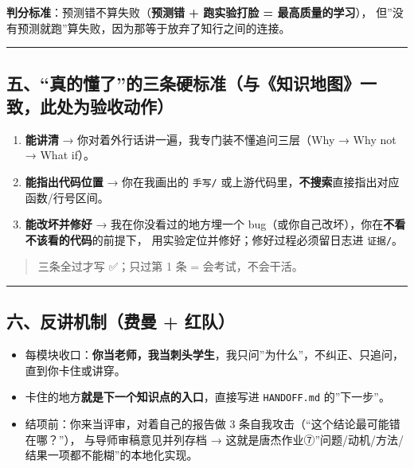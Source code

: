 \documentclass[
  chinese,
  11pt,
]{ctexart}
\providecommand{\tightlist}{%
  \setlength{\itemsep}{0pt}\setlength{\parskip}{0pt}}
\begin{document}
\textbf{判分标准}：预测错不算失败（\textbf{预测错 + 跑实验打脸 = 最高质量的学习}）， 但''没有预测就跑''算失败，因为那等于放弃了知行之间的连接。

\begin{center}\rule{0.5\linewidth}{0.5pt}\end{center}

\subsection{五、``真的懂了''的三条硬标准（与《知识地图》一致，此处为验收动作）}\label{ux4e94ux771fux7684ux61c2ux4e86ux7684ux4e09ux6761ux786cux6807ux51c6ux4e0eux77e5ux8bc6ux5730ux56feux4e00ux81f4ux6b64ux5904ux4e3aux9a8cux6536ux52a8ux4f5c}

\begin{enumerate}
\def\labelenumi{\arabic{enumi}.}
\tightlist
\item
  \textbf{能讲清} → 你对着外行话讲一遍，我专门装不懂追问三层（Why → Why not → What if）。
\item
  \textbf{能指出代码位置} → 你在我画出的 \texttt{手写/} 或上游代码里，\textbf{不搜索}直接指出对应函数/行号区间。
\item
  \textbf{能改坏并修好} → 我在你没看过的地方埋一个 bug（或你自己改坏），你在\textbf{不看不该看的代码}的前提下， 用实验定位并修好；修好过程必须留日志进 \texttt{证据/}。
\end{enumerate}

\begin{quote}
三条全过才写 ✅；只过第 1 条 = 会考试，不会干活。
\end{quote}

\begin{center}\rule{0.5\linewidth}{0.5pt}\end{center}

\subsection{六、反讲机制（费曼 + 红队）}\label{ux516dux53cdux8bb2ux673aux5236ux8d39ux66fc-ux7ea2ux961f}

\begin{itemize}
\tightlist
\item
  每模块收口：\textbf{你当老师，我当刺头学生}，我只问''为什么''，不纠正、只追问，直到你卡住或讲穿。
\item
  卡住的地方\textbf{就是下一个知识点的入口}，直接写进 \texttt{HANDOFF.md} 的''下一步''。
\item
  结项前：你来当评审，对着自己的报告做 3 条自我攻击（``这个结论最可能错在哪？''）， 与导师审稿意见并列存档 → 这就是唐杰作业⑦''问题/动机/方法/结果一项都不能糊''的本地化实现。
\end{itemize}
\end{document}
